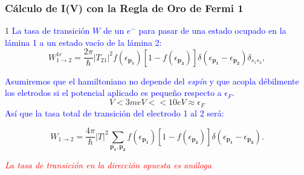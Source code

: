\begin{frame}
\frametitle{C\'alculo de I(V) con la Regla de Oro de Fermi 1}

1 \textcolor{blue}{La tasa de transici\'on $W$ de un $e^-$ para pasar de una estado ocupado en la l\'amina 1 a un estado vac\'io de la l\'amina 2:}
\begin{equation*}\label{probability1}
W_{1\to 2}^{1e} = \frac{2\pi}{\hbar} |T_{21}|^2 f(\epsilon_{\mathbf{p_1}}) [1-f(\epsilon_{\mathbf{p_2}})]
		\delta(\epsilon_{\mathbf{p_1}}-\epsilon_{\mathbf{p_2}})\delta_{s_1s_2},
\end{equation*}

 \textcolor{blue}{Asumiremos que el hamiltoniano no depende del \emph{esp\'in} y que acopla d\'ebilmente los eletrodos si el potencial aplicado es peque\~no respecto a $\epsilon_F$.}
$$V < 3meV << 10eV \approx \epsilon_F$$
\textcolor{blue}{As\'i que la tasa total de transici\'on del electrodo 1 al 2 ser\'a:}

\begin{equation*}\label{probability3}
W_{1\to 2} = \frac{4\pi}{\hbar} |T|^2 \sum_{\mathbf{p_1},\mathbf{p_2}}  
		f(\epsilon_{\mathbf{p_1}}) [1-f(\epsilon_{\mathbf{p_2}})] 
		\delta(\epsilon_{\mathbf{p_1}}-\epsilon_{\mathbf{p_2}}).
\end{equation*}

\pause
\begin{center}
\emph{\textcolor{red}{La tasa de transici\'on en la direcci\'on opuesta es an\'aloga}}
\end{center}

\end{frame}
